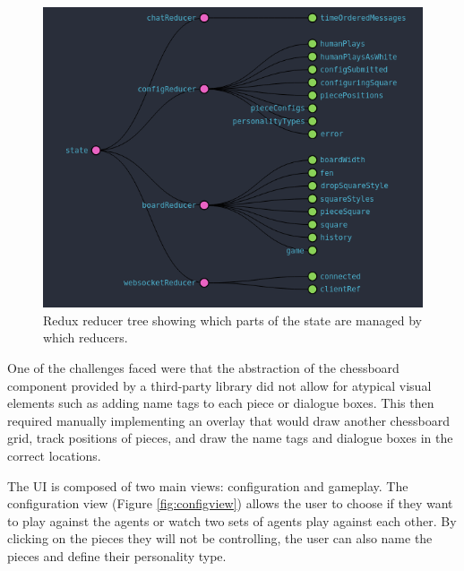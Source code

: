 \documentclass[conference]{IEEEtran}
\begin{document}
\begin{figure}[!h]
	\centering
	\includegraphics[width=\linewidth]{images/reducers}
	\caption{Redux reducer tree showing which parts of the state are managed by which reducers.}
	\label{fig:reducers}
\end{figure}

One of the challenges faced were that the abstraction of the chessboard component provided by a third-party library did not allow for atypical visual elements such as adding name tags to each piece or dialogue boxes. This then required manually implementing an overlay that would draw another chessboard grid, track positions of pieces, and draw the name tags and dialogue boxes in the correct locations. 

The UI is composed of two main views: configuration and gameplay. 
The configuration view (Figure \ref{fig:configview}) allows the user to choose if they want to play against the agents or watch two sets of agents play against each other. By clicking on the pieces they will not be controlling, the user can also name the pieces and define their personality type. 
\end{document}

